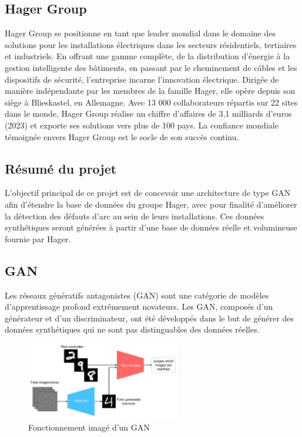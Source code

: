 \subsection{Hager Group}

Hager Group se positionne en tant que leader mondial dans le domaine des solutions pour les installations électriques dans les secteurs résidentiels, tertiaires et industriels. En offrant une gamme complète, de la distribution d'énergie à la gestion intelligente des bâtiments, en passant par le cheminement de câbles et les dispositifs de sécurité, l'entreprise incarne l'innovation électrique. Dirigée de manière indépendante par les membres de la famille Hager, elle opère depuis son siège à Blieskastel, en Allemagne. Avec 13 000 collaborateurs répartis sur 22 sites dans le monde, Hager Group réalise un chiffre d'affaires de 3,1 milliards d'euros (2023) et exporte ses solutions vers plus de 100 pays. La confiance mondiale témoignée envers Hager Group est le socle de son succès continu.

\subsection{Résumé du projet}

L'objectif principal de ce projet est de concevoir une architecture de type GAN afin d'étendre la base de données du groupe Hager, avec pour finalité d'améliorer la détection des défauts d'arc au sein de leurs installations. Ces données synthétiques seront générées à partir d'une base de données réelle et volumineuse fournie par Hager.

\subsection{GAN}

Les réseaux génératifs antagonistes (GAN) sont une catégorie de modèles d'apprentissage profond extrêmement novateurs. Les GAN, composés d'un générateur et d'un discriminateur, ont été développés dans le but de générer des données synthétiques qui ne sont pas distinguables des données réelles. 


\begin{figure}[h]
    \centering
    \includegraphics[width=0.6\textwidth]{logos/GANs.jpg}
    \caption{Fonctionnement imagé d'un GAN}
\end{figure}
